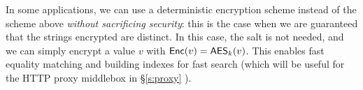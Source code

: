 In some applications, we can use a deterministic encryption scheme instead of the scheme above {\em without sacrificing security}: this is the case when we are guaranteed that the strings encrypted are distinct. In this case, the salt is not needed, and we can simply encrypt a value $v$ with $\mathsf{Enc}(v) = \mathsf{AES}_k(v)$. This enables fast equality matching and building indexes for fast search (which will be useful for the HTTP proxy middlebox in \S\ref{s:proxy} ).



